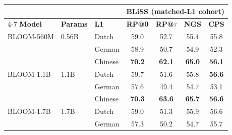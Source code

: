 \documentclass[11pt]{article}
\begin{document}
\begin{table}[!ht]
\centering\scriptsize
\setlength{\tabcolsep}{3pt}
\begin{tabular}{ll l cccc}
\toprule
& & & \multicolumn{4}{c}{\textbf{BLiSS (matched-L1 cohort)}} \\
\cmidrule(lr){4-7}
\textbf{Model} & \textbf{Params} & \textbf{L1} & \textbf{RP@0} & \textbf{RP@$\tau$} & \textbf{NGS} & \textbf{CPS} \\
\midrule
BLOOM-560M & 0.56B & Dutch & \cellcolor[rgb]{0.906,1.000,0.906} 59.0 & \cellcolor[rgb]{0.966,1.000,0.966} 52.7 & \cellcolor[rgb]{0.929,1.000,0.929} 55.4 & \cellcolor[rgb]{0.881,1.000,0.881} 55.8 \\
 &  & German & \cellcolor[rgb]{0.907,1.000,0.907} 58.9 & \cellcolor[rgb]{0.991,1.000,0.991} 50.7 & \cellcolor[rgb]{0.935,1.000,0.935} 54.9 & \cellcolor[rgb]{0.953,1.000,0.953} 52.3 \\
 &  & Chinese & \cellcolor[rgb]{0.789,1.000,0.789} \textbf{70.2} & \cellcolor[rgb]{0.847,1.000,0.847} \textbf{62.1} & \cellcolor[rgb]{0.801,1.000,0.801} \textbf{65.0} & \cellcolor[rgb]{0.875,1.000,0.875} \textbf{56.1} \\
\addlinespace[2pt]
BLOOM-1.1B & 1.1B & Dutch & \cellcolor[rgb]{0.899,1.000,0.899} 59.7 & \cellcolor[rgb]{0.980,1.000,0.980} 51.6 & \cellcolor[rgb]{0.923,1.000,0.923} 55.8 & \cellcolor[rgb]{0.865,1.000,0.865} \textbf{56.6} \\
 &  & German & \cellcolor[rgb]{0.921,1.000,0.921} 57.6 & \cellcolor[rgb]{1.000,0.994,0.994} 49.4 & \cellcolor[rgb]{0.938,1.000,0.938} 54.7 & \cellcolor[rgb]{0.937,1.000,0.937} 53.1 \\
 &  & Chinese & \cellcolor[rgb]{0.788,1.000,0.788} \textbf{70.3} & \cellcolor[rgb]{0.828,1.000,0.828} \textbf{63.6} & \cellcolor[rgb]{0.792,1.000,0.792} \textbf{65.7} & \cellcolor[rgb]{0.865,1.000,0.865} \textbf{56.6} \\
\addlinespace[2pt]
BLOOM-1.7B & 1.7B & Dutch & \cellcolor[rgb]{0.906,1.000,0.906} 59.0 & \cellcolor[rgb]{0.984,1.000,0.984} 51.3 & \cellcolor[rgb]{0.922,1.000,0.922} 55.9 & \cellcolor[rgb]{0.865,1.000,0.865} 56.6 \\
 &  & German & \cellcolor[rgb]{0.924,1.000,0.924} 57.3 & \cellcolor[rgb]{0.997,1.000,0.997} 50.2 & \cellcolor[rgb]{0.938,1.000,0.938} 54.7 & \cellcolor[rgb]{0.883,1.000,0.883} 55.7 \\

\end{tabular}
\end{table}
\end{document}
